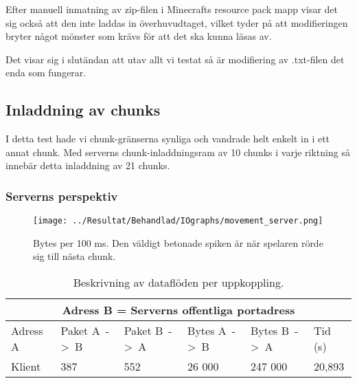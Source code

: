 \documentclass[journal,comsoc]{IEEEtran}
\begin{document}
Efter manuell inmatning av zip-filen i Minecrafts resource pack mapp visar det sig också att den inte laddas in överhuvudtaget, vilket tyder på att modifieringen bryter något mönster som krävs för att det ska kunna läsas av.

Det visar sig i slutändan att utav allt vi testat så är modifiering av .txt-filen det enda som fungerar.

\subsection{Inladdning av chunks}
I detta test hade vi chunk-gränserna synliga och vandrade helt enkelt in i ett annat chunk. Med serverns chunk-inladdningsram av 10 chunks i varje riktning så innebär detta inladdning av 21 chunks.
\subsubsection{Serverns perspektiv}
\begin{figure} [H]
  \centering
  \texttt{[image: ../Resultat/Behandlad/IOgraphs/movement\_server.png]}
  \caption{Bytes per 100 ms. Den väldigt betonade spiken är när spelaren rörde sig till nästa chunk.}
  \label{fig:server:chunk}
\end{figure}
\begin{table} [H]
  \begin{center}
    \label{table:server:chunk}
    \begin{tabular}{ | m{1.5cm} |  m{1cm} | m{1cm}| m{1cm}|m{1cm}|m{0.75cm}| } 
      \hline
      \multicolumn{6}{|c|}{Adress B = Serverns offentliga portadress} \\
      \hline
      Adress A & Paket A~->~B & Paket B~->~A & Bytes A~->~B & Bytes B~->~A & Tid (s) \\
      \hline
      Klient & 387 & 552 & 26 000 & 247 000 & 20,893 \\
      \hline 
    \end{tabular}
  \end{center}
  \caption{Beskrivning av dataflöden per uppkoppling.}
\end{table}
\end{document}

